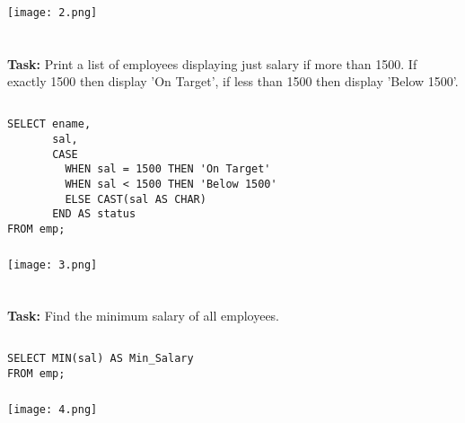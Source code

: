 \documentclass[12pt,a4paper]{article}
\begin{document}
\subsubsection{}
\begin{center}
    \texttt{[image: 2.png]}
\end{center}


\section{}
\textbf{Task:} Print a list of employees displaying just salary if more than 1500. If
exactly 1500 then display 'On Target', if less than 1500 then display
'Below 1500'.

\subsection{}
\begin{lstlisting}
SELECT ename,
       sal,
       CASE
         WHEN sal = 1500 THEN 'On Target'
         WHEN sal < 1500 THEN 'Below 1500'
         ELSE CAST(sal AS CHAR)
       END AS status
FROM emp;
\end{lstlisting}

\subsubsection{}
\begin{center}
    \texttt{[image: 3.png]}
\end{center}


\section{}
\textbf{Task:} Find the minimum salary of all employees.

\subsection{}
\begin{lstlisting}
SELECT MIN(sal) AS Min_Salary
FROM emp;
\end{lstlisting}

\subsubsection{}
\begin{center}
    \texttt{[image: 4.png]}
\end{center}
\end{document}
